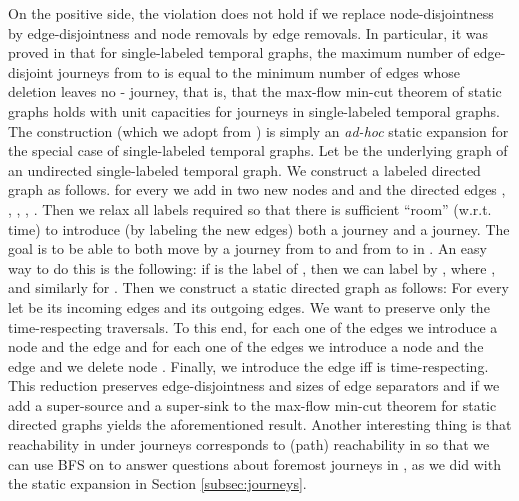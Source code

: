 \documentclass[oribibl, 11pt]{llncs}
\begin{document}
On the positive side, the violation does not hold if we replace node-disjointness by edge-disjointness and node removals by edge removals. In particular, it was proved in \cite{Be96} that for single-labeled temporal graphs,  the maximum number of edge-disjoint journeys from  to  is equal to the minimum number of edges whose deletion leaves no - journey, that is, that the max-flow min-cut theorem of static graphs holds with unit capacities for journeys in single-labeled temporal graphs. The construction (which we adopt from \cite{KKK00}) is simply an \emph{ad-hoc} static expansion for the special case of single-labeled temporal graphs. Let  be the underlying graph of an undirected single-labeled temporal graph. We construct a labeled directed graph  as follows. for every  we add in  two new nodes  and  and the directed edges , , , , . Then we relax all labels required so that there is sufficient ``room'' (w.r.t. time) to introduce (by labeling the new edges) both a  journey and a  journey. The goal is to be able to both move by a journey from  to  and from  to  in . An easy way to do this is the following: if  is the label of , then we can label  by , where , and similarly for . Then we construct a static directed graph  as follows: For every  let  be its incoming edges and  its outgoing edges. We want to preserve only the time-respecting  traversals. To this end, for each one of the  edges we introduce a node  and the edge  and for each one of the  edges we introduce a node  and the edge  and we delete node . Finally, we introduce the edge  iff  is time-respecting. This reduction preserves edge-disjointness and sizes of edge separators and if we add a super-source and a super-sink to  the max-flow min-cut theorem for static directed graphs yields the aforementioned result. Another interesting thing is that reachability in  under journeys corresponds to (path) reachability in  so that we can use BFS on  to answer questions about foremost journeys in , as we did with the static expansion in Section \ref{subsec:journeys}.
\end{document}
